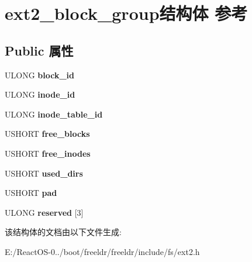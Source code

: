 \hypertarget{structext2__block__group}{}\section{ext2\+\_\+block\+\_\+group结构体 参考}
\label{structext2__block__group}
\subsection*{Public 属性}
\begin{DoxyCompactItemize}
\item 
\mbox{\label{structext2__block__group_ab5b0ef4213fb3b66530d0db501d2b760}} 
U\+L\+O\+NG {\bfseries block\+\_\+id}
\item 
\mbox{\label{structext2__block__group_a451ec4854030d67766923e0263a13913}} 
U\+L\+O\+NG {\bfseries inode\+\_\+id}
\item 
\mbox{\label{structext2__block__group_a07587420b3a9005dbf2a5576b261e79d}} 
U\+L\+O\+NG {\bfseries inode\+\_\+table\+\_\+id}
\item 
\mbox{\label{structext2__block__group_aa845b244d280f4b71c21a3af966c59c9}} 
U\+S\+H\+O\+RT {\bfseries free\+\_\+blocks}
\item 
\mbox{\label{structext2__block__group_a07a8245487530b3a20631bf2758e6643}} 
U\+S\+H\+O\+RT {\bfseries free\+\_\+inodes}
\item 
\mbox{\label{structext2__block__group_a36370620751c6f12a92bdc79efcba507}} 
U\+S\+H\+O\+RT {\bfseries used\+\_\+dirs}
\item 
\mbox{\label{structext2__block__group_aeb0d9efadc2e42eb2550cf0b13dd4b59}} 
U\+S\+H\+O\+RT {\bfseries pad}
\item 
\mbox{\label{structext2__block__group_a8a4339f5cea18eb45929839a154c8567}} 
U\+L\+O\+NG {\bfseries reserved} \mbox{[}3\mbox{]}
\end{DoxyCompactItemize}


该结构体的文档由以下文件生成\+:\begin{DoxyCompactItemize}
\item 
E\+:/\+React\+O\+S-\/0../boot/freeldr/freeldr/include/fs/ext2.\+h\end{DoxyCompactItemize}
